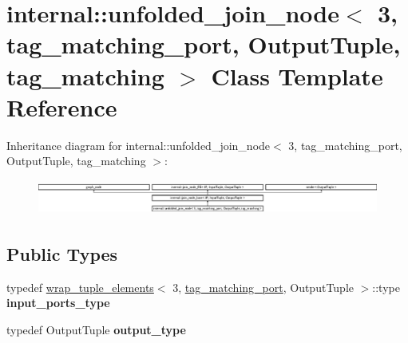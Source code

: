 \hypertarget{classinternal_1_1unfolded__join__node_3_013_00_01tag__matching__port_00_01OutputTuple_00_01tag__matching_01_4}{}\section{internal\+:\+:unfolded\+\_\+join\+\_\+node$<$ 3, tag\+\_\+matching\+\_\+port, Output\+Tuple, tag\+\_\+matching $>$ Class Template Reference}
\label{classinternal_1_1unfolded__join__node_3_013_00_01tag__matching__port_00_01OutputTuple_00_01tag__matching_01_4}
Inheritance diagram for internal\+:\+:unfolded\+\_\+join\+\_\+node$<$ 3, tag\+\_\+matching\+\_\+port, Output\+Tuple, tag\+\_\+matching $>$\+:\begin{figure}[H]
\begin{center}
\leavevmode
\includegraphics[height=1.161826cm]{classinternal_1_1unfolded__join__node_3_013_00_01tag__matching__port_00_01OutputTuple_00_01tag__matching_01_4}
\end{center}
\end{figure}
\subsection*{Public Types}
\begin{DoxyCompactItemize}
\item 
\hypertarget{classinternal_1_1unfolded__join__node_3_013_00_01tag__matching__port_00_01OutputTuple_00_01tag__matching_01_4_a77328997a1313c24619c81874919e28d}{}typedef \hyperlink{structinternal_1_1wrap__tuple__elements}{wrap\+\_\+tuple\+\_\+elements}$<$ 3, \hyperlink{classinternal_1_1tag__matching__port}{tag\+\_\+matching\+\_\+port}, Output\+Tuple $>$\+::type {\bfseries input\+\_\+ports\+\_\+type}\label{classinternal_1_1unfolded__join__node_3_013_00_01tag__matching__port_00_01OutputTuple_00_01tag__matching_01_4_a77328997a1313c24619c81874919e28d}

\item 
\hypertarget{classinternal_1_1unfolded__join__node_3_013_00_01tag__matching__port_00_01OutputTuple_00_01tag__matching_01_4_aee63ece980f8abe5994208e4adbd8f0d}{}typedef Output\+Tuple {\bfseries output\+\_\+type}\label{classinternal_1_1unfolded__join__node_3_013_00_01tag__matching__port_00_01OutputTuple_00_01tag__matching_01_4_aee63ece980f8abe5994208e4adbd8f0d}

\end{DoxyCompactItemize}
